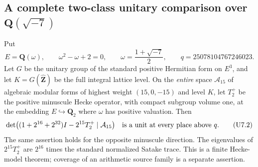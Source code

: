 \subsection{A complete two-class unitary comparison over \texorpdfstring{$\mathbf Q(\sqrt{-7})$}{Q(sqrt(-7))}}
\label{sec:u3-minus7}

\begin{theorem}[K17-U3-MINUS7]\label{thm:u3-minus7-unit}
Put
\[
 E=\mathbf Q(\omega),\qquad \omega^2-\omega+2=0,
 \qquad \omega=\frac{1+\sqrt{-7}}2,
 \qquad q=25078104767246023.
 \tag{U7.1}
\]
Let $G$ be the unitary group of the standard positive Hermitian form
on $E^3$, and let $K=G(\widehat{\mathbf Z})$ be the full integral
lattice level. On the \emph{entire} space $\mathcal A_{15}$ of
algebraic modular forms of highest weight $(15,0,-15)$ and level $K$,
let $T_2^+$ be the positive minuscule Hecke operator, with compact
subgroup volume one, at the embedding $E\hookrightarrow\mathbf Q_2$
where $\omega$ has positive valuation. Then
\[
 \det\bigl((1+2^{16}+2^{32})I-2^{15}T_2^+
                  \mid\mathcal A_{15}\bigr)
 \quad\hbox{is a unit at every place above }q.
 \tag{U7.2}
\]
The same assertion holds for the opposite minuscule direction.
The eigenvalues of $2^{15}T_2^+$ are $2^{16}$ times the standard
normalized Satake trace. This is a finite Hecke-model theorem;
coverage of an arithmetic source family is a separate assertion.
\end{theorem}

